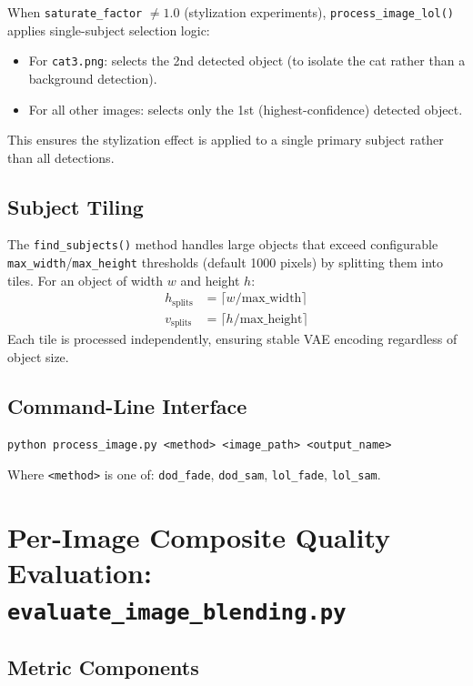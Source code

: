 \documentclass[11pt,a4paper]{article}
\begin{document}
When \texttt{saturate\_factor} $\neq 1.0$ (stylization experiments), \texttt{process\_image\_lol()} applies single-subject selection logic:
\begin{itemize}
  \item For \texttt{cat3.png}: selects the 2nd detected object (to isolate the cat rather than a background detection).
  \item For all other images: selects only the 1st (highest-confidence) detected object.
\end{itemize}
This ensures the stylization effect is applied to a single primary subject rather than all detections.

\subsection{Subject Tiling}

The \texttt{find\_subjects()} method handles large objects that exceed configurable \texttt{max\_width}/\texttt{max\_height} thresholds (default 1000 pixels) by splitting them into tiles. For an object of width $w$ and height $h$:
\begin{align}
  h_{\text{splits}} &= \lceil w / \text{max\_width} \rceil \\
  v_{\text{splits}} &= \lceil h / \text{max\_height} \rceil
\end{align}
Each tile is processed independently, ensuring stable VAE encoding regardless of object size.

\subsection{Command-Line Interface}

\begin{lstlisting}[style=bash]
python process_image.py <method> <image_path> <output_name>
\end{lstlisting}

Where \texttt{<method>} is one of: \texttt{dod\_fade}, \texttt{dod\_sam}, \texttt{lol\_fade}, \texttt{lol\_sam}.

\section{Per-Image Composite Quality Evaluation: \texttt{evaluate\_image\_blending.py}}

\subsection{Metric Components}
\end{document}
